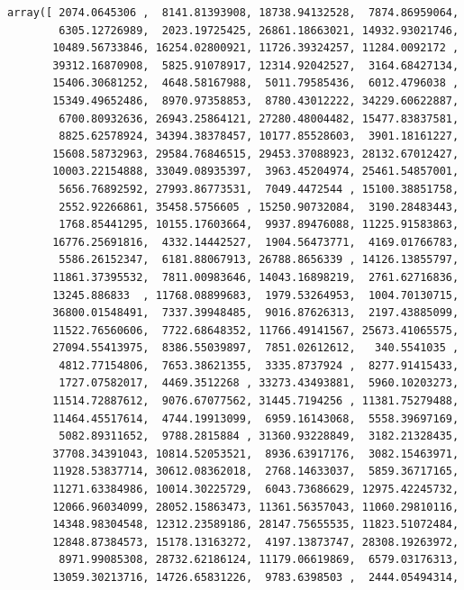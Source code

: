 \documentclass[11pt]{article}
\makeatletter
\newcommand{\boxspacing}{\kern\kvtcb@left@rule\kern\kvtcb@boxsep}
\newcommand{\prompt}[4]{
        {\ttfamily\llap{{\color{#2}[#3]:\hspace{3pt}#4}}\vspace{-\baselineskip}}
    }
\makeatother
\begin{document}
            \begin{tcolorbox}[breakable, size=fbox, boxrule=.5pt, pad at break*=1mm, opacityfill=0]
\prompt{Out}{outcolor}{58}{\boxspacing}
\begin{Verbatim}[commandchars=\\\{\}]
array([ 2074.0645306 ,  8141.81393908, 18738.94132528,  7874.86959064,
        6305.12726989,  2023.19725425, 26861.18663021, 14932.93021746,
       10489.56733846, 16254.02800921, 11726.39324257, 11284.0092172 ,
       39312.16870908,  5825.91078917, 12314.92042527,  3164.68427134,
       15406.30681252,  4648.58167988,  5011.79585436,  6012.4796038 ,
       15349.49652486,  8970.97358853,  8780.43012222, 34229.60622887,
        6700.80932636, 26943.25864121, 27280.48004482, 15477.83837581,
        8825.62578924, 34394.38378457, 10177.85528603,  3901.18161227,
       15608.58732963, 29584.76846515, 29453.37088923, 28132.67012427,
       10003.22154888, 33049.08935397,  3963.45204974, 25461.54857001,
        5656.76892592, 27993.86773531,  7049.4472544 , 15100.38851758,
        2552.92266861, 35458.5756605 , 15250.90732084,  3190.28483443,
        1768.85441295, 10155.17603664,  9937.89476088, 11225.91583863,
       16776.25691816,  4332.14442527,  1904.56473771,  4169.01766783,
        5586.26152347,  6181.88067913, 26788.8656339 , 14126.13855797,
       11861.37395532,  7811.00983646, 14043.16898219,  2761.62716836,
       13245.886833  , 11768.08899683,  1979.53264953,  1004.70130715,
       36800.01548491,  7337.39948485,  9016.87626313,  2197.43885099,
       11522.76560606,  7722.68648352, 11766.49141567, 25673.41065575,
       27094.55413975,  8386.55039897,  7851.02612612,   340.5541035 ,
        4812.77154806,  7653.38621355,  3335.8737924 ,  8277.91415433,
        1727.07582017,  4469.3512268 , 33273.43493881,  5960.10203273,
       11514.72887612,  9076.67077562, 31445.7194256 , 11381.75279488,
       11464.45517614,  4744.19913099,  6959.16143068,  5558.39697169,
        5082.89311652,  9788.2815884 , 31360.93228849,  3182.21328435,
       37708.34391043, 10814.52053521,  8936.63917176,  3082.15463971,
       11928.53837714, 30612.08362018,  2768.14633037,  5859.36717165,
       11271.63384986, 10014.30225729,  6043.73686629, 12975.42245732,
       12066.96034099, 28052.15863473, 11361.56357043, 11060.29810116,
       14348.98304548, 12312.23589186, 28147.75655535, 11823.51072484,
       12848.87384573, 15178.13163272,  4197.13873747, 28308.19263972,
        8971.99085308, 28732.62186124, 11179.06619869,  6579.03176313,
       13059.30213716, 14726.65831226,  9783.6398503 ,  2444.05494314,

\end{Verbatim}
\end{tcolorbox}
\end{document}

